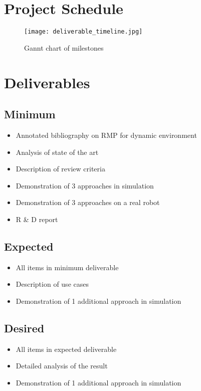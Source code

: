 \documentclass[rnd]{mas_proposal}
\begin{document}
\section{Project Schedule}

\begin{figure}[h!]
    \texttt{[image: deliverable\_timeline.jpg]}
    \caption{Gannt chart of milestones}
    \label{}
\end{figure}

\section{Deliverables}
\subsection{Minimum}

\begin{itemize}
    \item Annotated bibliography on RMP for dynamic environment
    \item Analysis of state of the art
    \item Description of review criteria
    \item Demonstration of 3 approaches in simulation
    \item Demonstration of 3 approaches on a real robot
    \item R \& D report 
\end{itemize}

\subsection{Expected}
\begin{itemize}
    \item All items in minimum deliverable
    \item Description of use cases
    \item Demonstration of 1 additional approach in simulation
\end{itemize}

\subsection{Desired}
\begin{itemize}
    \item All items in expected deliverable
    \item Detailed analysis of the result
    \item Demonstration of 1 additional approach in simulation
\end{itemize}


\nocite{*}

\end{document}

